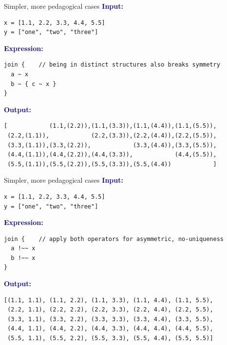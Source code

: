 \documentclass[aspectratio=169]{beamer}
\begin{document}
\begin{frame}[fragile]{Simpler, more pedagogical cases}
\vspace{0.25 cm}
\textcolor{darkblue}{\large\bf Input:}

\begin{verbatim}
x = [1.1, 2.2, 3.3, 4.4, 5.5]
y = ["one", "two", "three"]
\end{verbatim}

\vspace{0.25 cm}
\textcolor{darkblue}{\large\bf Expression:}

\begin{verbatim}
join {    // being in distinct structures also breaks symmetry
  a ~ x
  b ~ { c ~ x }
}
\end{verbatim}

\vspace{0.25 cm}
\textcolor{darkblue}{\large\bf Output:}

\begin{verbatim}
[            (1.1,(2.2)),(1.1,(3.3)),(1.1,(4.4)),(1.1,(5.5)),
 (2.2,(1.1)),            (2.2,(3.3)),(2.2,(4.4)),(2.2,(5.5)),
 (3.3,(1.1)),(3.3,(2.2)),            (3.3,(4.4)),(3.3,(5.5)),
 (4.4,(1.1)),(4.4,(2.2)),(4.4,(3.3)),            (4.4,(5.5)),
 (5.5,(1.1)),(5.5,(2.2)),(5.5,(3.3)),(5.5,(4.4))            ]
\end{verbatim}
\end{frame}

\begin{frame}[fragile]{Simpler, more pedagogical cases}
\vspace{0.25 cm}
\textcolor{darkblue}{\large\bf Input:}

\begin{verbatim}
x = [1.1, 2.2, 3.3, 4.4, 5.5]
y = ["one", "two", "three"]
\end{verbatim}

\vspace{0.25 cm}
\textcolor{darkblue}{\large\bf Expression:}

\begin{verbatim}
join {    // apply both operators for asymmetric, no-uniqueness
  a !~~ x
  b !~~ x
}
\end{verbatim}

\vspace{0.25 cm}
\textcolor{darkblue}{\large\bf Output:}
\begin{verbatim}
[(1.1, 1.1), (1.1, 2.2), (1.1, 3.3), (1.1, 4.4), (1.1, 5.5),
 (2.2, 1.1), (2.2, 2.2), (2.2, 3.3), (2.2, 4.4), (2.2, 5.5),
 (3.3, 1.1), (3.3, 2.2), (3.3, 3.3), (3.3, 4.4), (3.3, 5.5),
 (4.4, 1.1), (4.4, 2.2), (4.4, 3.3), (4.4, 4.4), (4.4, 5.5),
 (5.5, 1.1), (5.5, 2.2), (5.5, 3.3), (5.5, 4.4), (5.5, 5.5)]
\end{verbatim}
\end{frame}
\end{document}
